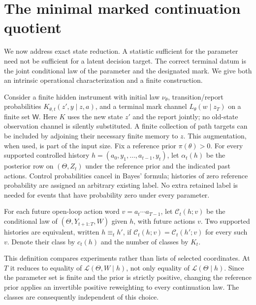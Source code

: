 \section{The minimal marked continuation quotient}
\label{sec:v10-marked}

We now address exact state reduction. A statistic sufficient for the
parameter need not be sufficient for a latent decision target. The
correct terminal datum is the joint conditional law of the parameter
and the designated mark. We give both an intrinsic operational
characterization and a finite construction.

Consider a finite hidden instrument with initial law $\nu_\theta$,
transition/report probabilities $K_{\theta,t}(z',y\mid z,a)$, and a
terminal mark channel $L_\theta(w\mid z_T)$ on a finite set $\mathsf W$.
Here $K$ uses the new state $z'$ and the report jointly; no old-state
observation channel is silently substituted. A finite collection of
path targets can be included by adjoining their necessary finite
memory to $z$. This augmentation, when used, is part of the input size.
Fix a reference prior $\pi(\theta)>0$. For every supported controlled
history $h=(a_0,y_1,\ldots,a_{t-1},y_t)$, let
$\alpha_t(h)$ be the posterior row on $(\Theta,Z_t)$ under the
reference prior and the indicated past actions. Control probabilities
cancel in Bayes' formula; histories of zero reference probability are
assigned an arbitrary existing label. No extra retained label is needed
for events that have probability zero under every parameter.

\begin{definition}\label{def:v10-continuation}
For each future open-loop action word $v=a_t\cdots a_{T-1}$, let
$\mathcal C_t(h;v)$ be the conditional law of
$(\Theta,Y_{t+1:T},W)$ given $h$, with future actions $v$.
Two supported histories are equivalent, written $h\equiv_t h'$, if
$\mathcal C_t(h;v)=\mathcal C_t(h';v)$ for every such $v$.
Denote their class by $c_t(h)$ and the number of classes by $K_t$.
\end{definition}

This definition compares experiments rather than lists of selected
coordinates. At $T$ it reduces to equality of
$\mathcal L(\Theta,W\mid h)$, not only equality of
$\mathcal L(\Theta\mid h)$. Since the parameter set is finite and the
prior is strictly positive, changing the reference prior applies an
invertible positive reweighting to every continuation law. The
classes are consequently independent of this choice.

